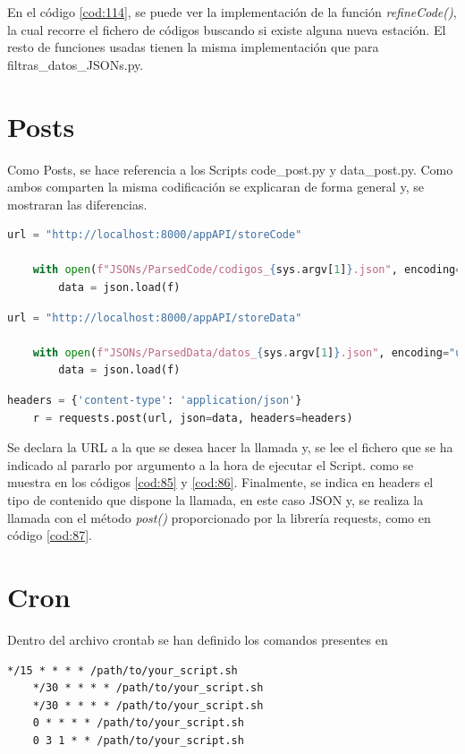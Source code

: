 En el código \ref{cod:114}, se puede ver la implementación de la función \textit{refineCode()}, la cual recorre el fichero de códigos buscando si existe alguna nueva estación. El resto de funciones usadas tienen la misma implementación que para filtras\_datos\_JSONs.py.

\section{Posts}
Como Posts, se hace referencia a los Scripts code\_post.py y data\_post.py. Como ambos comparten la misma codificación se explicaran de forma general y, se mostraran las diferencias.

\begin{lstlisting}[language=Python, caption={Declaración variables code\_post.py}, label=cod:85]
	url = "http://localhost:8000/appAPI/storeCode"
	
	with open(f"JSONs/ParsedCode/codigos_{sys.argv[1]}.json", encoding="utf-8") as f:
		data = json.load(f)
\end{lstlisting}

\begin{lstlisting}[language=Python, caption={Declaración variables data\_post.py}, label=cod:86]
	url = "http://localhost:8000/appAPI/storeData"
	
	with open(f"JSONs/ParsedData/datos_{sys.argv[1]}.json", encoding="utf-8") as f:
		data = json.load(f)
\end{lstlisting}

\begin{lstlisting}[language=Python, caption={Llamada POST}, label=cod:87]
	headers = {'content-type': 'application/json'}
	r = requests.post(url, json=data, headers=headers)
\end{lstlisting}

Se declara la URL a la que se desea hacer la llamada y, se lee el fichero que se ha indicado al pararlo por argumento a la hora de ejecutar el Script. como se muestra en los códigos \ref{cod:85} y \ref{cod:86}. Finalmente, se indica en headers el tipo de contenido que dispone la llamada, en este caso JSON y, se realiza la llamada con el método \textit{post()} proporcionado por la librería requests, como en código \ref{cod:87}.

\section{Cron}
Dentro del archivo crontab se han definido los comandos presentes en 

\begin{lstlisting}[caption={Trabajos configurados para ser ejecutados por Cron}, label=cod:103]
	*/15 * * * * /path/to/your_script.sh
	*/30 * * * * /path/to/your_script.sh
	*/30 * * * * /path/to/your_script.sh
	0 * * * * /path/to/your_script.sh
	0 3 1 * * /path/to/your_script.sh
\end{lstlisting}